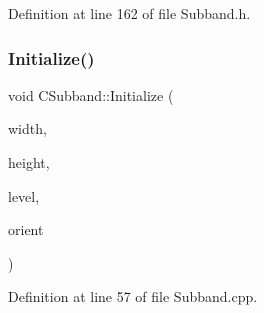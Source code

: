 Definition at line 162 of file Subband.\+h.


\begin{DoxyCode}{0}

\end{DoxyCode}
\mbox{\label{classCSubband_a5bdfe417903304a7b7348feb65904839}} 
\subsubsection{\texorpdfstring{Initialize()}{Initialize()}}
{\footnotesize\ttfamily void C\+Subband\+::\+Initialize (\begin{DoxyParamCaption}\item[{U\+I\+N\+T32}]{width,  }\item[{U\+I\+N\+T32}]{height,  }\item[{int}]{level,  }\item[{\mbox{\hyperlink{PGFtypes_8h_a871118a09520247c78a71ecd7b0abd58}{Orientation}}}]{orient }\end{DoxyParamCaption})\hspace{0.3cm}{\ttfamily [private]}}



Definition at line 57 of file Subband.\+cpp.


